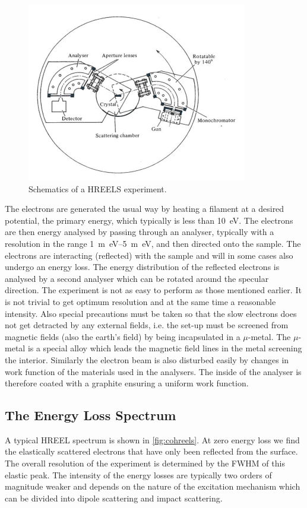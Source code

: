 \begin{figure}[h!]
	\begin{center}
	\includegraphics[scale=4]{figures/08_01.png}
	\caption{Schematics of a HREELS experiment.}
	\label{fig:hreelssetup}
	\end{center}
\end{figure}

The electrons are generated the usual way by heating a filament at a desired potential, the primary energy, which typically is less than \SI{10}{\electronvolt}. The electrons are then energy analysed by passing through an analyser, typically with a resolution in the range \SIrange{1}{5}{m\electronvolt}, and then  directed onto the sample. The electrons are interacting (reflected) with the sample and will in some cases also undergo an energy loss. The energy distribution of the reflected electrons is analysed by a second analyser which can be rotated around the specular direction. The experiment is not as easy to perform as those mentioned earlier. It is not trivial to get optimum resolution and at the same time a reasonable intensity. Also special precautions must be taken so that the slow electrons does not get detracted by any external fields, i.e. the set-up must be screened from magnetic fields (also the earth's field) by being incapsulated in a $\mu$-metal. The $\mu$-metal is a special alloy which leads the magnetic field lines in the metal screening the interior. Similarly the electron beam is also disturbed easily by changes in work function of the materials used in the analysers. The inside of the analyser is therefore coated with a graphite  ensuring a uniform work function.

\subsection{The Energy Loss Spectrum}
A typical HREEL spectrum is shown in \autoref{fig:cohreels}. At zero energy loss we find the elastically scattered electrons that have only been reflected from the surface. The overall resolution of the experiment is determined  by the FWHM of this elastic peak. The intensity of the energy losses are typically two orders of magnitude weaker and depends on the  nature of the excitation mechanism which can be  divided into dipole scattering and impact scattering.

